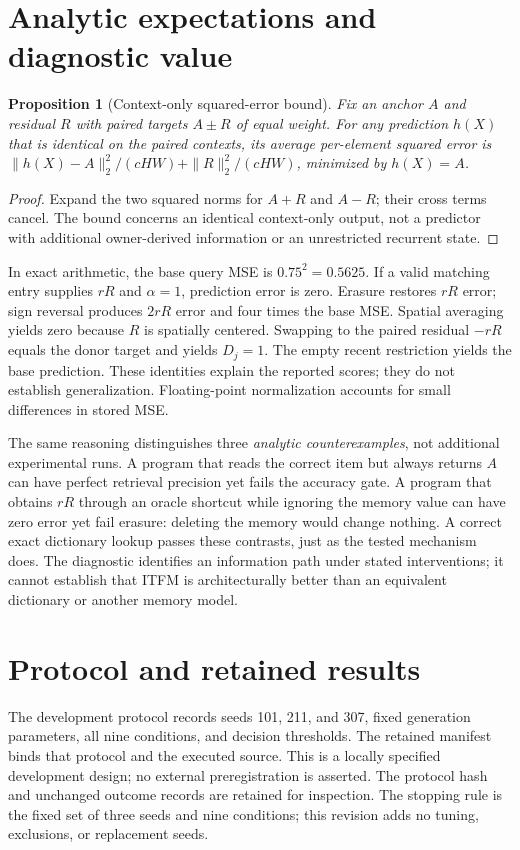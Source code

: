 \documentclass[11pt]{article}
\newtheorem{proposition}{Proposition}
\begin{document}
\section{Analytic expectations and diagnostic value}
\begin{proposition}[Context-only squared-error bound]
Fix an anchor $A$ and residual $R$ with paired targets $A\pm R$ of equal
weight. For any prediction $h(X)$ that is identical on the paired contexts,
its average per-element squared error is
$\|h(X)-A\|_2^2/(cHW)+\|R\|_2^2/(cHW)$, minimized by $h(X)=A$.
\end{proposition}
\begin{proof}
Expand the two squared norms for $A+R$ and $A-R$; their cross terms cancel.
The bound concerns an identical context-only output, not a predictor with
additional owner-derived information or an unrestricted recurrent state.
\end{proof}

In exact arithmetic, the base query MSE is $0.75^2=0.5625$. If a valid
matching entry supplies $rR$ and $\alpha=1$, prediction error is zero. Erasure
restores $rR$ error; sign reversal produces $2rR$ error and four times the
base MSE. Spatial averaging yields zero because $R$ is spatially centered.
Swapping to the paired residual $-rR$ equals the donor target and yields
$D_j=1$. The empty recent restriction yields the base prediction. These
identities explain the reported scores; they do not establish generalization.
Floating-point normalization accounts for small differences in stored MSE.

The same reasoning distinguishes three \emph{analytic counterexamples}, not
additional experimental runs. A program that reads the correct item but
always returns $A$ can have perfect retrieval precision yet fails the accuracy
gate. A program that obtains $rR$ through an oracle shortcut while ignoring
the memory value can have zero error yet fail erasure: deleting the memory
would change nothing. A correct exact dictionary lookup passes these
contrasts, just as the tested mechanism does. The diagnostic identifies an
information path under stated interventions; it cannot establish that ITFM is
architecturally better than an equivalent dictionary or another memory model.

\section{Protocol and retained results}
The development protocol records seeds 101, 211, and 307, fixed generation
parameters, all nine conditions, and decision thresholds. The retained
manifest binds that protocol and the executed source. This is a locally
specified development design; no external preregistration is asserted.
The protocol hash and unchanged outcome records are retained for inspection.
The stopping rule is the fixed set of three seeds and nine conditions; this
revision adds no tuning, exclusions, or replacement seeds.
\end{document}
